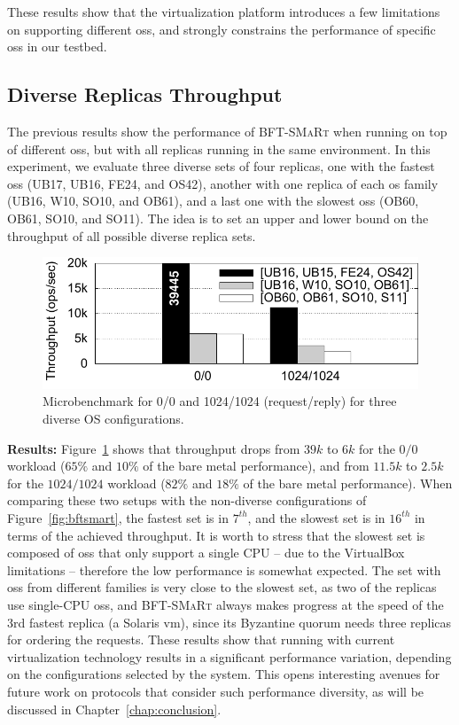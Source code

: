 These results show that the virtualization platform introduces a few limitations on supporting different \glspl{os}, and strongly constrains the performance of specific \glspl{os} in our testbed.


\subsection{Diverse Replicas Throughput}
\label{sec:performancediversity}

The previous results show the performance of \textsc{BFT-SMaRt} when running on top of different \glspl{os}, but with all replicas running in the same environment.
In this experiment, we evaluate three diverse sets of four replicas, one with the fastest \glspl{os} (UB17, UB16, FE24, and OS42), another with one replica of each \gls{os} family (UB16, W10, SO10, and OB61), and a last one with the slowest \glspl{os} (OB60, OB61, SO10, and SO11).
The idea is to set an upper and lower bound on the throughput of all possible diverse replica sets.

\begin{figure}[t]
\begin{center}
\includegraphics[width=0.8\columnwidth]{images/gnuplot/vagrant/runs_diversity/throughput.pdf}
\caption{Microbenchmark for 0/0 and 1024/1024 (request/reply) for three diverse OS configurations.}
\label{fig:diversets}
\end{center}
\end{figure}


\textbf{Results:}
Figure~\ref{fig:diversets} shows that throughput drops from $39k$ to $6k$ for the $0/0$ workload ($65\%$ and $10\%$ of the bare metal performance), and from $11.5k$ to $2.5k$ for the $1024/1024$ workload ($82\%$ and $18\%$ of the bare metal performance).
When comparing these two setups with the non-diverse configurations of Figure~\ref{fig:bftsmart}, the fastest set is in $7^{th}$, and the slowest set is in $16^{th}$ in terms of the achieved throughput.
It is worth to stress that the slowest set is composed of \glspl{os} that only support a single CPU -- due to the VirtualBox limitations -- therefore the low performance is somewhat expected.
The set with \glspl{os} from different families is very close to the slowest set, as two of the replicas use single-CPU \glspl{os}, and \textsc{BFT-SMaRt} always makes progress at the speed of the 3rd fastest replica (a Solaris \gls{vm}), since its Byzantine quorum needs three replicas for ordering the requests.
These results show that running \system with current virtualization technology results in a significant performance variation, depending on the configurations selected by the system.
This opens interesting avenues for future work on protocols that consider such performance diversity, as will be discussed in Chapter~\ref{chap:conclusion}.

